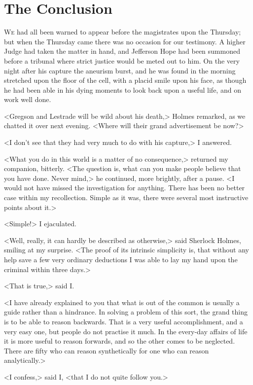 \chapter{The Conclusion}
\lettrine{W}{e} had all been warned to appear before the magistrates upon the Thursday; but when the Thursday came there was no occasion for our testimony. A higher Judge had taken the matter in hand, and Jefferson Hope had been summoned before a tribunal where strict justice would be meted out to him. On the very night after his capture the aneurism burst, and he was found in the morning stretched upon the floor of the cell, with a placid smile upon his face, as though he had been able in his dying moments to look back upon a useful life, and on work well done.

<Gregson and Lestrade will be wild about his death,> Holmes remarked, as we chatted it over next evening. <Where will their grand advertisement be now?>

<I don't see that they had very much to do with his capture,> I answered.

<What you do in this world is a matter of no consequence,> returned my companion, bitterly. <The question is, what can you make people believe that you have done. Never mind,> he continued, more brightly, after a pause. <I would not have missed the investigation for anything. There has been no better case within my recollection. Simple as it was, there were several most instructive points about it.>

<Simple!> I ejaculated.

<Well, really, it can hardly be described as otherwise,> said Sherlock Holmes, smiling at my surprise. <The proof of its intrinsic simplicity is, that without any help save a few very ordinary deductions I was able to lay my hand upon the criminal within three days.>

<That is true,> said I\@.

<I have already explained to you that what is out of the common is usually a guide rather than a hindrance. In solving a problem of this sort, the grand thing is to be able to reason backwards. That is a very useful accomplishment, and a very easy one, but people do not practise it much. In the every-day affairs of life it is more useful to reason forwards, and so the other comes to be neglected. There are fifty who can reason synthetically for one who can reason analytically.>

<I confess,> said I, <that I do not quite follow you.>

